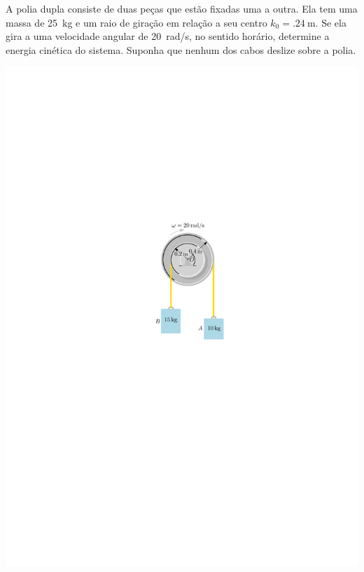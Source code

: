 \begin{minipage}{.6\linewidth}
	\vspace{-4cm}
	\item A polia dupla consiste de duas peças que estão fixadas uma a outra. Ela tem uma massa de \SI{25}{\kilogram} e um
	raio de giração em relação a seu centro $k_{0}=\SI{.24}{\meter}$. Se ela gira a uma velocidade angular de \SI{20}{\radian/\second},
	no sentido horário, determine a energia cinética do sistema.
	Suponha que nenhum dos cabos deslize sobre a polia.
\end{minipage}
\begin{minipage}{.4\linewidth}
	\begin{flushright}
		\includegraphics[scale=1.2]{../../images/draw_1}
	\end{flushright}
\end{minipage}